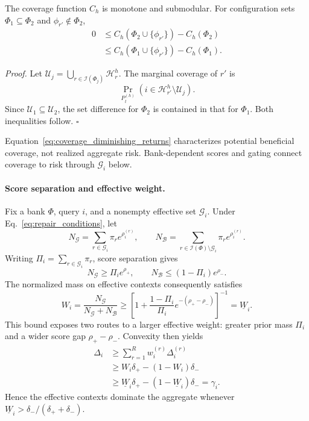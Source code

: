\begin{lemma}
\label{prop:coverage_submodular}
The coverage function $C_h$ is monotone and submodular. For configuration
sets $\Phi_1\subseteq\Phi_2$ and $\phi_{r'}\notin\Phi_2$,
\begin{equation}
\begin{aligned}
0
&\leq C_h(\Phi_2\cup\{\phi_{r'}\})-C_h(\Phi_2)\\
&\leq C_h(\Phi_1\cup\{\phi_{r'}\})-C_h(\Phi_1).
\end{aligned}
\label{eq:coverage_diminishing_returns}
\end{equation}
\end{lemma}

\noindent\emph{Proof.}
Let
$\mathcal U_j=\bigcup_{r\in\mathcal I(\Phi_j)}\mathcal H_r^h$.
The marginal
coverage of $r'$ is
\[
\Pr_{P_t^{(h)}}(i\in\mathcal H_{r'}^h\setminus\mathcal U_j).
\]
Since $\mathcal U_1\subseteq\mathcal U_2$, the set difference for
$\Phi_2$ is contained in that for $\Phi_1$.  Both inequalities follow.
\hfill$\square$

Equation~\eqref{eq:coverage_diminishing_returns} characterizes potential
beneficial coverage, not realized aggregate risk. Bank-dependent scores and
gating connect coverage to risk through $\mathcal G_i$ below.

\paragraph{Score separation and effective weight.}
\label{app:evidence-separation}

Fix a bank $\Phi$, query $i$, and a nonempty effective set $\mathcal G_i$. Under
Eq.~\eqref{eq:repair_conditions}, let
\[
N_{\mathcal G}
=\sum_{r\in\mathcal G_i}\pi_r e^{\rho_i^{(r)}},
\qquad
N_{\mathcal B}
=\sum_{r\in\mathcal I(\Phi)\setminus\mathcal G_i}\pi_r e^{\rho_i^{(r)}}.
\]
Writing $\Pi_i=\sum_{r\in\mathcal G_i}\pi_r$, score separation gives
\[
N_{\mathcal G}\geq\Pi_i e^{\rho_+},
\qquad
N_{\mathcal B}\leq(1-\Pi_i)e^{\rho_-}.
\]
The normalized mass on effective contexts consequently satisfies
\begin{equation}
W_i
=\frac{N_{\mathcal G}}{N_{\mathcal G}+N_{\mathcal B}}
\geq
\left[1+\frac{1-\Pi_i}{\Pi_i}
e^{-(\rho_+-\rho_-)}\right]^{-1}
=\underline W_i.
\label{eq:appendix_effective_weight}
\end{equation}
This bound exposes two routes to a larger effective weight: greater prior
mass $\Pi_i$ and a wider score gap $\rho_+-\rho_-$.  Convexity then yields
\begin{equation}
\begin{aligned}
\Delta_i
&\geq\sum_{r=1}^{R} w_i^{(r)}\Delta_i^{(r)}\\
&\geq W_i\delta_+-(1-W_i)\delta_-\\
&\geq\underline W_i\delta_+-(1-\underline W_i)\delta_-
=\gamma_i.
\end{aligned}
\label{eq:appendix_aggregate_gain}
\end{equation}
Hence the effective contexts dominate the aggregate whenever
$\underline W_i>\delta_-/(\delta_++\delta_-)$.

